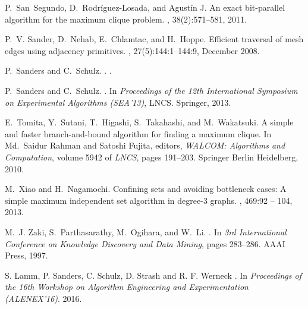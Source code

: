 \documentclass[11pt]{article}
\begin{document}
\begin{thebibliography}{10}
P.~San~Segundo, D.~Rodríguez-Losada, and Agustín J.
\newblock An exact bit-parallel algorithm for the maximum clique problem.
, 38(2):571--581, 2011.

P.~V. Sander, D.~Nehab, E.~Chlamtac, and H.~Hoppe.
\newblock Efficient traversal of mesh edges using adjacency primitives.
, 27(5):144:1--144:9, December 2008.

P.~Sanders and C.~Schulz.
.
.

P.~Sanders and C.~Schulz.
.
\newblock In {\em Proceedings of the 12th International Symposium on
  Experimental Algorithms (SEA'13)}, LNCS. Springer, 2013.

E.~Tomita, Y.~Sutani, T.~Higashi, S.~Takahashi, and M.~Wakatsuki.
\newblock A simple and faster branch-and-bound algorithm for finding a maximum
  clique.
\newblock In Md.~Saidur Rahman and Satoshi Fujita, editors, {\em WALCOM:
  Algorithms and Computation}, volume 5942 of {\em LNCS}, pages 191--203.
  Springer Berlin Heidelberg, 2010.

M.~Xiao and H.~Nagamochi.
\newblock Confining sets and avoiding bottleneck cases: A simple maximum
  independent set algorithm in degree-3 graphs.
, 469:92 -- 104, 2013.

M.~J. Zaki, S.~Parthasarathy, M.~Ogihara, and W.~Li.
.
\newblock In {\em 3rd International Conference on Knowledge Discovery and Data
  Mining}, pages 283--286. AAAI Press, 1997.

S. Lamm, P. Sanders, C. Schulz, D. Strash and R. F. Werneck
.
\newblock In {\em Proceedings of the 16th Workshop on Algorithm Engineering and Experimentation (ALENEX'16)}. 2016.

\end{thebibliography}
\end{document}
